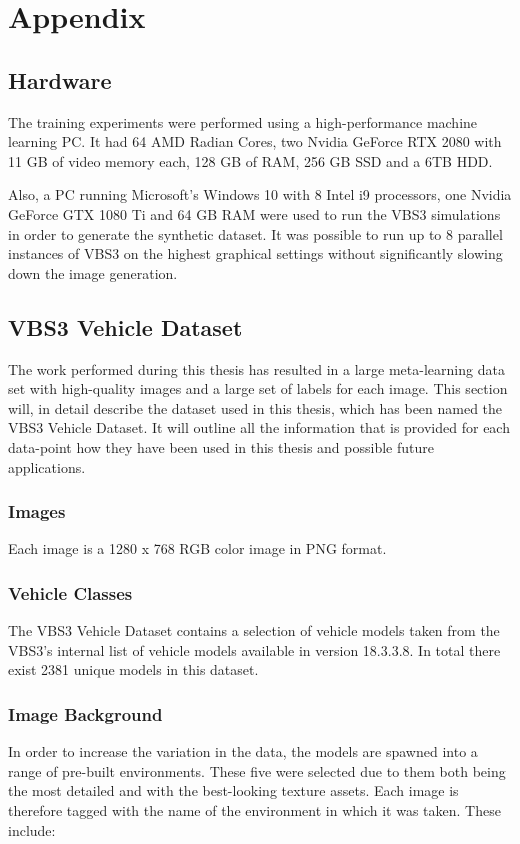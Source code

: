 \chapter{Appendix}
\section{Hardware}\label{hardware}
The training experiments were performed using a high-performance machine learning PC. It had 64 AMD Radian Cores, two Nvidia GeForce RTX 2080 with 11 GB of video memory each, 128 GB of RAM, 256 GB SSD and a 6TB HDD.

Also, a PC running Microsoft's Windows 10 with 8 Intel i9 processors, one Nvidia GeForce GTX 1080 Ti and 64 GB RAM were used to run the VBS3 simulations in order to generate the synthetic dataset. It was possible to run up to 8 parallel instances of VBS3 on the highest graphical settings without significantly slowing down the image generation.

\section{VBS3 Vehicle Dataset}\label{dataset-result}
The work performed during this thesis has resulted in a large meta-learning data set with high-quality images and a large set of labels for each image. This section will, in detail describe the dataset used in this thesis, which has been named the VBS3 Vehicle Dataset. It will outline all the information that is provided for each data-point how they have been used in this thesis and possible future applications.

\subsection{Images}
Each image is a 1280 x 768 RGB color image in PNG format.

\subsection{Vehicle Classes}
The VBS3 Vehicle Dataset contains a selection of vehicle models taken from the VBS3's internal list of vehicle models available in version 18.3.3.8. In total there exist 2381 unique models in this dataset. 

\subsection{Image Background}\label{settings}
In order to increase the variation in the data, the models are spawned into a range of pre-built environments. These five were selected due to them both being the most detailed and with the best-looking texture assets. Each image is therefore tagged with the name of the environment in which it was taken. These include: 

